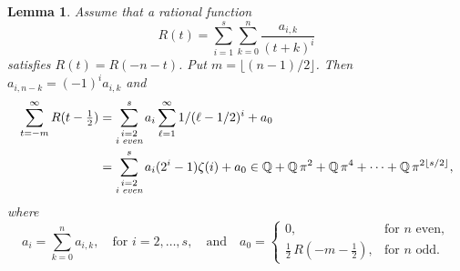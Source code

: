 \documentclass[12pt,reqno]{amsart}
\newtheorem{lemma}{Lemma}%
\begin{document}
\begin{lemma}
\label{lem1}
Assume that a rational function
$$
R(t)=\sum_{i=1}^s\sum_{k=0}^n\frac{a_{i,k}}{(t+k)^i}
$$
satisfies $R(t)=R(-n-t)$. Put $m=\lfloor(n-1)/2\rfloor$.
Then $a_{i,n-k}=(-1)^ia_{i,k}$ and
\begin{align*}
\sum_{t=-m}^\infty R(t-\tfrac12)
&=\sum_{\substack{i=2\\i\;\text{\em even}}}^sa_i\sum_{\ell=1}^\infty\frac1{(\ell-\frac12)^i}+a_0
\\
&=\sum_{\substack{i=2\\i\;\text{\em even}}}^sa_i(2^i-1)\zeta(i)+a_0
\in\mathbb Q+\mathbb Q\,\pi^2+\mathbb Q\,\pi^4+\dots+\mathbb Q\,\pi^{2\lfloor s/2\rfloor},
\end{align*}
where
$$
a_i=\sum_{k=0}^na_{i,k}, \quad\text{for }i=2,\dots,s,
\quad\text{and}\quad
a_0=\begin{cases}
0, &\text{for $n$ even}, \\
\tfrac12\,R(-m-\tfrac12), &\text{for $n$ odd}.
\end{cases}
$$
\end{lemma}
\end{document}
